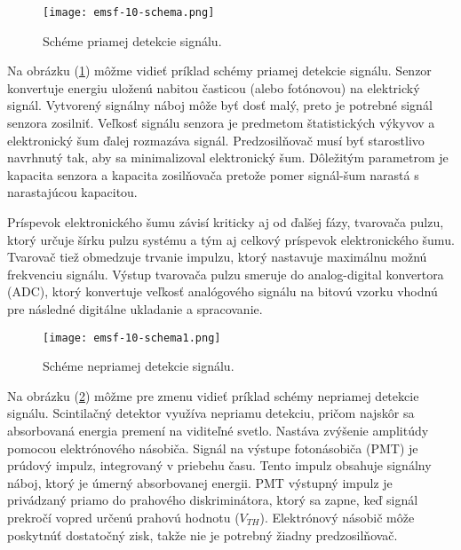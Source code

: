 \documentclass[../../main.tex]{subfiles}
\begin{document}
\begin{figure}[!h]
\texttt{[image: emsf-10-schema.png]}
\centering
\caption{Schéme priamej detekcie signálu.}
\label{em10:fig:priamaschema}
\end{figure}

Na obrázku (\ref{em10:fig:priamaschema}) môžme vidieť príklad schémy priamej detekcie signálu. Senzor konvertuje energiu uloženú nabitou časticou (alebo fotónovou) na elektrický signál. Vytvorený signálny náboj môže byť dosť malý, preto je potrebné signál senzora zosilniť. Veľkosť signálu senzora je predmetom štatistických výkyvov a elektronický šum ďalej rozmazáva signál. Predzosilňovač musí byť starostlivo navrhnutý tak, aby sa minimalizoval elektronický šum. Dôležitým parametrom je kapacita senzora a kapacita zosilňovača pretože pomer signál-šum narastá s narastajúcou kapacitou.

Príspevok elektronického šumu závisí kriticky aj od ďalšej fázy, tvarovača pulzu, ktorý určuje šírku pulzu systému a tým aj celkový príspevok elektronického šumu. Tvarovač tiež obmedzuje trvanie impulzu, ktorý nastavuje maximálnu možnú frekvenciu signálu. Výstup tvarovača pulzu smeruje do analog-digital konvertora (ADC), ktorý konvertuje veľkosť analógového signálu na bitovú vzorku vhodnú pre následné digitálne ukladanie a spracovanie.

\begin{figure}[!h]
\texttt{[image: emsf-10-schema1.png]}
\centering
\caption{Schéme nepriamej detekcie signálu.}
\label{em10:fig:nepriamaschema}
\end{figure}

Na obrázku (\ref{em10:fig:nepriamaschema}) môžme pre zmenu vidieť príklad schémy nepriamej detekcie signálu. Scintilačný detektor využíva nepriamu detekciu, pričom najskôr sa absorbovaná energia premení na viditeľné svetlo. Nastáva zvýšenie amplitúdy pomocou elektrónového násobiča. Signál na výstupe fotonásobiča (PMT) je prúdový impulz, integrovaný v priebehu času. Tento impulz obsahuje signálny náboj, ktorý je úmerný absorbovanej energii. PMT výstupný impulz je privádzaný priamo do prahového diskriminátora, ktorý sa zapne, keď signál prekročí vopred určenú prahovú hodnotu ($V_{TH}$). Elektrónový násobič môže poskytnúť dostatočný zisk, takže nie je potrebný žiadny predzosilňovač.
\end{document}
